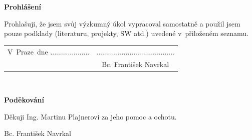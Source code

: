 \documentclass[a4paper,twoside,12pt]{scrbook}
\newcommand{\tb}{\textbf} %
\newcommand{\woman}{} %
\newcommand{\autor}{Bc. František Navrkal}   %
\newcommand{\kde}{Praze} %
\newcommand{\prohlaseni}{Prohlašuji, že jsem svůj výzkumný úkol vypracoval\woman{} samostatně a použil\woman{} jsem pouze podklady (literaturu, projekty, SW atd.) uvedené v~přiloženém seznamu.} %
\newcommand{\podekovani}{Děkuji Ing. Martinu Plajnerovi za jeho pomoc a ochotu.} %
\begin{document}
\newpage %
\thispagestyle{empty}  %

~ %

\newpage %
\thispagestyle{empty}  %

~ %
\vfill %

\tb{Prohlášení} %

\vspace{1em} %
\prohlaseni

\vspace{2em}  %
\hspace{-0.5em}\begin{tabularx}{\textwidth}{X c}  %
V~\kde\ dne .................... &........................................ \\	%
	& \autor
\end{tabularx}	%


\newpage
\thispagestyle{empty}

~
\vfill %


\tb{Poděkování}

\vspace{1em} %
\podekovani
\begin{flushright}
\autor
\end{flushright}  %
\end{document}
